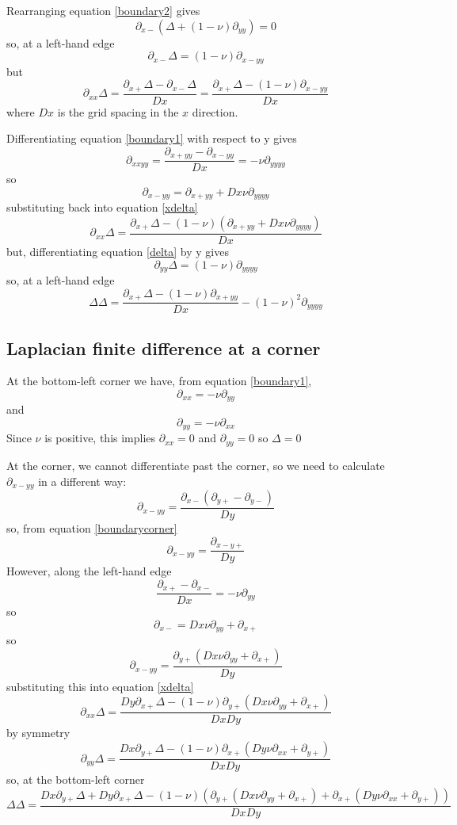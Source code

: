 \documentclass[a4paper]{article}
\begin{document}
Rearranging equation \ref{boundary2} gives
\[
\partial_{x-}(\Delta + (1-\nu)\partial_{yy}) = 0
\]
so, at a left-hand edge
\begin{equation}
\partial_{x-}\Delta = (1-\nu)\partial_{x-yy}
\end{equation}
but
\begin{equation}
\partial_{xx}\Delta = \frac{\partial_{x+}\Delta - \partial_{x-}\Delta}{Dx} = \frac{\partial_{x+}\Delta - (1-\nu)\partial_{x-yy}}{Dx}
\label{xdelta}
\end{equation}
where $Dx$ is the grid spacing in the $x$ direction.

Differentiating equation \ref{boundary1} with respect to y gives
\[
\partial_{xxyy} = \frac{\partial_{x+yy} - \partial_{x-yy}}{Dx}= -\nu\partial_{yyyy}
\]
so
\[
\partial_{x-yy} = \partial_{x+yy} + Dx\nu\partial_{yyyy}
\]
substituting back into equation \ref{xdelta}
\[
\partial_{xx}\Delta = \frac{\partial_{x+}\Delta -(1-\nu)(\partial_{x+yy} + Dx\nu\partial_{yyyy})}{Dx}
\]
but, differentiating equation \ref{delta} by y gives
\[
\partial_{yy}\Delta = (1-\nu)\partial_{yyyy}
\]
so, at a left-hand edge
\begin{equation}
\Delta\Delta = \frac{\partial_{x+}\Delta -(1-\nu)\partial_{x+yy}}{Dx} - (1-\nu)^2\partial_{yyyy}
\label{DeltaDelta}
\end{equation}

\subsection{Laplacian finite difference at a corner}
At the bottom-left corner we have, from equation \ref{boundary1},
\[
\partial_{xx} = - \nu \partial_{yy} 
\]
and
\[
\partial_{yy} = - \nu \partial_{xx} 
\]
Since $\nu$ is positive, this implies $\partial_{xx} = 0$ and $\partial_{yy} = 0$ so $\Delta = 0$

At the corner, we cannot differentiate past the corner, so we need to calculate $\partial_{x-yy}$ in a different way:
\[
\partial_{x-yy} = \frac{\partial_{x-}(\partial_{y+} - \partial_{y-})}{Dy}
\]
so, from equation \ref{boundarycorner}
\[
\partial_{x-yy} = \frac{\partial_{x-y+}}{Dy}
\]
However,  along the left-hand edge
\[
\frac{\partial_{x+} - \partial_{x-}}{Dx}=-\nu\partial_{yy}
\]
so
\[
 \partial_{x-}=Dx\nu\partial_{yy} + \partial_{x+}
\]
so
\[
\partial_{x-yy} = \frac{\partial_{y+}(Dx\nu\partial_{yy} + \partial_{x+})}{Dy}
\]
substituting this into equation \ref{xdelta}
\[
\partial_{xx}\Delta = \frac{Dy\partial_{x+}\Delta - (1-\nu)\partial_{y+}(Dx\nu\partial_{yy} + \partial_{x+})}{DxDy}
\]
by symmetry
\[
\partial_{yy}\Delta = \frac{Dx\partial_{y+}\Delta - (1-\nu)\partial_{x+}(Dy\nu\partial_{xx} + \partial_{y+})}{DxDy}
\]
so, at the bottom-left corner
\begin{equation}
\Delta\Delta = \frac{Dx\partial_{y+}\Delta + Dy\partial_{x+}\Delta - (1-\nu)(\partial_{y+}(Dx\nu\partial_{yy} + \partial_{x+}) + \partial_{x+}(Dy\nu\partial_{xx} + \partial_{y+}))}{DxDy}
\end{equation}

\end{document}
